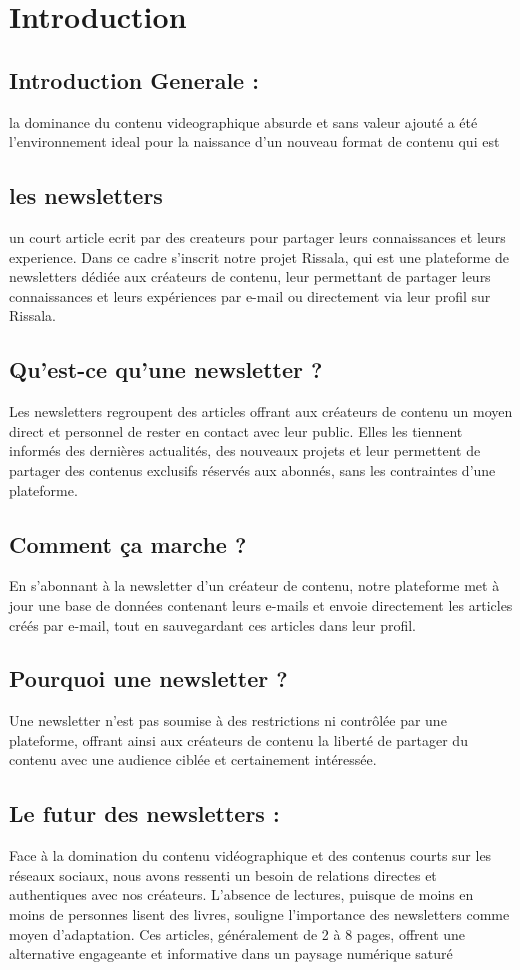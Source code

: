 \chapter{Introduction} 

\section{Introduction Generale : 
}
la dominance du contenu videographique absurde et sans valeur ajouté a été l'environnement ideal pour la naissance d'un nouveau format de contenu qui est
\section{les newsletters }
un court article ecrit par des createurs pour partager leurs connaissances et leurs experience. 
Dans ce cadre s'inscrit notre projet Rissala, qui est une plateforme de newsletters dédiée aux créateurs de contenu, leur permettant de partager leurs connaissances et leurs expériences par e-mail ou directement via leur profil sur Rissala.

\section{Qu'est-ce qu'une newsletter ?}
Les newsletters regroupent des articles offrant aux créateurs de contenu un moyen direct et personnel de rester en contact avec leur public. Elles les tiennent informés des dernières actualités, des nouveaux projets et leur permettent de partager des contenus exclusifs réservés aux abonnés, sans les contraintes d'une plateforme.
\section{Comment ça marche ?}
En s'abonnant à la newsletter d'un créateur de contenu, notre plateforme met à jour une base de données contenant leurs e-mails et envoie directement les articles créés par e-mail, tout en sauvegardant ces articles dans leur profil.
\section{Pourquoi une newsletter ?}
Une newsletter n'est pas soumise à des restrictions ni contrôlée par une plateforme, offrant ainsi aux créateurs de contenu la liberté de partager du contenu avec une audience ciblée et certainement intéressée.
\section{Le futur des newsletters :}
Face à la domination du contenu vidéographique et des contenus courts sur les réseaux sociaux, nous avons ressenti un besoin de relations directes et authentiques avec nos créateurs. L'absence de lectures, puisque de moins en moins de personnes lisent des livres, souligne l'importance des newsletters comme moyen d'adaptation. Ces articles, généralement de 2 à 8 pages, offrent une alternative engageante et informative dans un paysage numérique saturé 